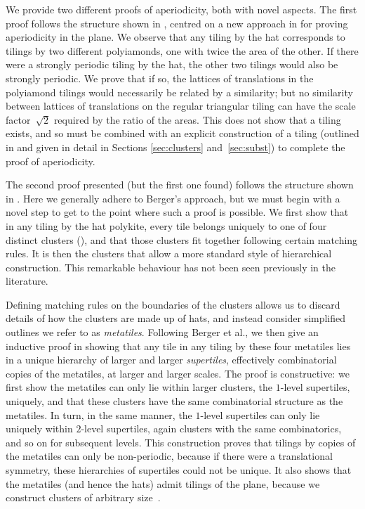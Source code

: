 We provide two different proofs of aperiodicity, both with novel
aspects.  The first proof follows the structure shown in
, centred on a 
new approach in  for proving aperiodicity in the plane.
We observe that
any tiling by the hat corresponds to tilings by two different
polyiamonds, one with twice the area of the other.  If there were a
strongly periodic tiling by the hat, the other two tilings would also
be strongly periodic. We prove that if so, the lattices of
translations in the polyiamond tilings would necessarily be related by a
similarity; but
no similarity between lattices of translations on the regular
triangular tiling can have the scale factor~$\sqrt{2}$ required by the
ratio of the areas.  This does not show that a tiling exists, and so
must be combined with an explicit construction of a tiling (outlined
in  and given in detail in Sections
\ref{sec:clusters} and~\ref{sec:subst}) to complete the proof of
aperiodicity.

The second proof presented (but the first one found) follows the structure
shown in .  Here we generally adhere to
Berger's approach, but we must begin with a novel step
to get to the point where such a proof is possible.  
We first show that in any tiling by
the hat polykite, every tile belongs uniquely to one of four distinct
clusters (), and that those clusters fit together
following certain matching rules.
It is then the clusters that allow a more standard style of 
hierarchical construction.
This  remarkable behaviour has not been seen previously in the literature.

Defining matching rules on the boundaries of the clusters allows us to
discard details of how the clusters are made up of hats, and instead
consider simplified outlines we refer to as \emph{metatiles}.
Following Berger et al., we then give an inductive proof in 
showing that any
tile in any tiling by these four metatiles lies in a unique hierarchy
of larger and larger \textit{supertiles}, effectively combinatorial copies
of the metatiles, at larger and larger scales. The proof is
constructive: we first show the metatiles can only lie within larger
clusters, the $1$-level supertiles, uniquely, and that these clusters
have the same combinatorial structure as the metatiles. In turn, in
the same manner, the $1$-level supertiles can only lie uniquely within
$2$-level supertiles, again clusters with the same combinatorics, and so on
for subsequent levels.
This construction proves that tilings by copies of the
metatiles can only be non-periodic, because if there were a
translational symmetry, these hierarchies of supertiles could not be
unique. It also shows that the metatiles (and hence the hats) admit 
tilings of the plane, because we
construct clusters of arbitrary size~\cite[Theorem 3.8.1]{GS}.

